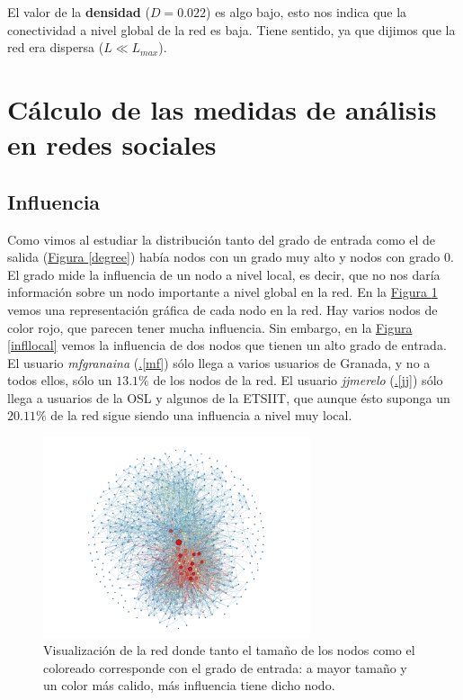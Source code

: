 \documentclass[10pt,a4paper,spanish]{article}
\numberwithin{equation}{section} %
\numberwithin{figure}{section} %
\numberwithin{table}{section} %
\begin{document}
El valor de la \textbf{densidad} ($D = 0.022$) es algo bajo, esto nos indica que la conectividad a nivel global de la red es baja. Tiene sentido, ya que dijimos que la red era dispersa ($L \ll L_{max}$).

\section{Cálculo de las medidas de análisis en redes sociales}

\subsection{Influencia}
Como vimos al estudiar la distribución tanto del grado de entrada como el de salida (\hyperref[degree]{Figura \ref*{degree}}) había nodos con un grado muy alto y nodos con grado 0. El grado mide la influencia de un nodo a nivel local, es decir, que no nos daría información sobre un nodo importante a nivel global en la red. En la \hyperref[influencia]{Figura \ref*{influencia}} vemos una representación gráfica de cada nodo en la red. Hay varios nodos de color rojo, que parecen tener mucha influencia. Sin embargo, en la \hyperref[infllocal]{Figura \ref*{infllocal}} vemos la influencia de dos nodos que tienen un alto grado de entrada. El usuario \textit{mfgranaina} (\hyperref[mf]{\thesection .\ref*{mf}}) sólo llega a varios usuarios de Granada, y no a todos ellos, sólo un $13.1\%$ de los nodos de la red. El usuario \textit{jjmerelo} (\hyperref[jj]{\thesection .\ref*{jj}}) sólo llega a usuarios de la OSL y algunos de la ETSIIT, que aunque ésto suponga un $20.11\%$ de la red sigue siendo una influencia a nivel muy local.

\begin{figure}[!h]
    \centering
    \includegraphics[width=0.7\textwidth]{medidas_locales/influencia}
    \caption{Visualización de la red donde tanto el tamaño de los nodos como el coloreado corresponde con el grado de entrada: a mayor tamaño y un color más calido, más influencia tiene dicho nodo.}
    \label{influencia}
\end{figure}
\end{document}
